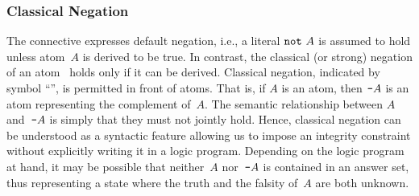 \subsubsection{Classical Negation}\label{subsec:gringo:negation}

The connective  expresses default negation,
i.e., a literal $\texttt{not}~A$ is assumed to hold unless atom~$A$ is derived to be true.
In contrast, the classical (or strong) negation of an atom~\cite{gellif91a} %
holds only if %
it can be derived.
Classical negation, indicated by symbol ``\code{-}'', is permitted in front of atoms.
That is, if $A$ is an atom, then $\texttt{-}A$ is
an atom representing the complement of~$A$.
The semantic relationship between $A$ and~$\texttt{-}A$
is simply that they
must not jointly hold.
Hence,
classical negation can be understood as a syntactic feature
allowing us to impose an integrity constraint 
without explicitly writing it in a logic program.
Depending on the logic program at hand,
it may be possible that neither~$A$ nor~$\texttt{-}A$ is contained in an answer set,
thus representing a state where the truth and the falsity of~$A$ are both unknown.

